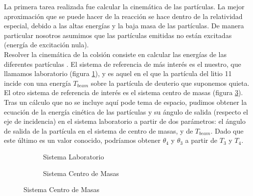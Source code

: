 \documentclass[12pt,a4paper]{article}
\numberwithin{equation}{section}
\numberwithin{figure}{section}
\begin{document}
La primera tarea realizada fue calcular la cinemática de las partículas. La mejor aproximación que se puede hacer de la reacción se hace dentro de la relatividad especial, debido a las altas energías y la baja masa de las partículas. De manera particular nosotros asumimos que las partículas emitidas no están excitadas (energía de excitación nula). \\

Resolver la cinemática de la colsión consiste en calcular las energías de las diferentes partículas . El sistema de referencia de más interés es el nuestro, que llamamos laboratorio (figura \ref{Fig:2.3.01-Lab}), y es aquel en el que la partícula del litio 11 incide con una energía $T_{beam}$ sobre la partícula de deuterio que suponemos quieta. El otro sistema de referencia de interés es el sistema centro de masas (figura \ref{Fig:2.3.01-CM}). \\

Tras un cálculo que no se incluye aquí pode tema de espacio, pudimos obtener la ecuación de la energía cinética de las partículas y su ángulo de salida (respecto el eje de incidencia) en el sistema laboratorio a partir de dos parámetros: el ángulo de salida de la partícula en el sistema de centro de masas, y de $T_{beam}$. Dado que este último es un valor conocido, podríamos obtener $\theta_4$ y $\theta_3$ a partir de $T_3$ y $T_4$.   \\

\begin{figure}[h!] \centering
\begin{subfigure}[b]{0.45\linewidth} \centering
    \caption{Sistema Laboratorio}
    \label{Fig:2.3.01-Lab}
\end{subfigure}
\begin{subfigure}[b]{0.45\linewidth} \centering
    \caption{Sistema Centro de Masas}
    \label{Fig:2.3.01-CM}
\end{subfigure}
\end{figure}
\end{document}
